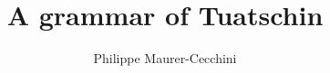 \author{Philippe Maurer-Cecchini}
\title{A grammar of Tuatschin}
\subtitle{}
\renewcommand{\lsSeries}{cgl}
\renewcommand{\lsSeriesNumber}{}
